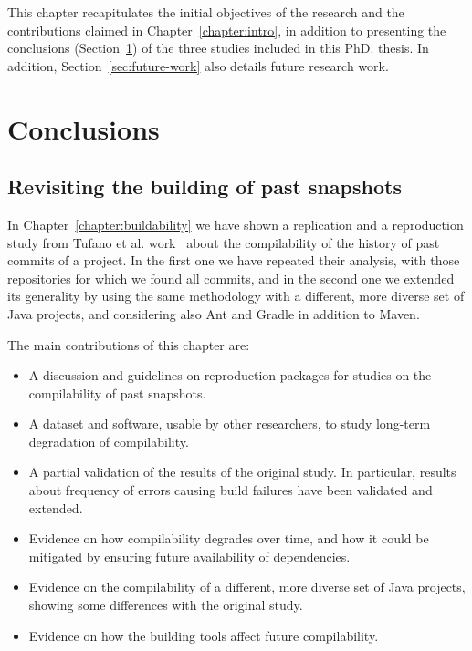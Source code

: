 This chapter recapitulates the initial objectives of the research and the contributions claimed in Chapter~\ref{chapter:intro}, in addition to presenting the conclusions (Section~\ref{sec:conclusions}) of the three studies included in this PhD. thesis. 
In addition, Section~\ref{sec:future-work} also details future research work.

\section{Conclusions}
\label{sec:conclusions}

\subsection{Revisiting the building of past snapshots}

In Chapter~\ref{chapter:buildability} we have shown a replication and a reproduction study from Tufano et al. work~\cite{tufano2017there} about the compilability of the history of past commits of a project. 
In the first one we have repeated their analysis, with those repositories for which we found all commits, and in the second one we extended its generality by using the same methodology with a different, more diverse set of Java projects, and considering also Ant and Gradle in addition to Maven.

The main contributions of this chapter are:

\begin{itemize}
\item A discussion and guidelines on reproduction packages for studies on the compilability of past snapshots. 
\item A dataset and software, usable by other researchers, to study long-term degradation of compilability.
\item A partial validation of the results of the original study. In particular, results about frequency of errors causing build failures have been validated and extended.
\item Evidence on how compilability degrades over time, and how it could be mitigated by ensuring future availability of dependencies.
\item Evidence on the compilability of a different, more diverse set of Java projects, showing some differences with the original study.
\item Evidence on how the building tools affect future compilability.
\end{itemize}

